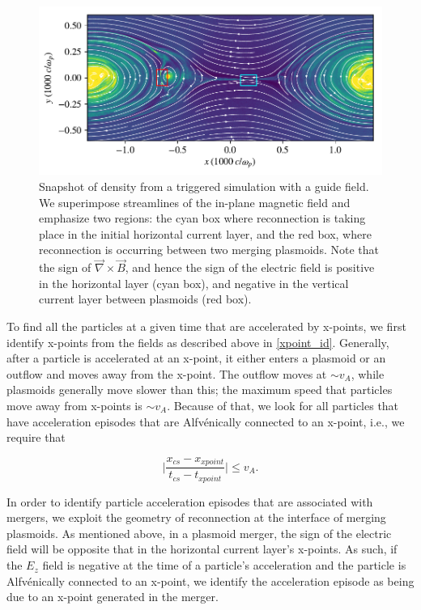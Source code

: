 \documentclass[iop,twocolappendix]{emulateapj}
\begin{document}
\begin{figure}[!h]
	\includegraphics[width=\linewidth]{testing_blines.pdf}
	\caption{Snapshot of density from a triggered simulation with a guide field.  We superimpose streamlines of the in-plane magnetic field and emphasize two regions: the cyan box where reconnection is taking place in the initial horizontal current layer, and the red box, where reconnection is occurring between two merging plasmoids.  Note that the sign of $\vec{\nabla}\times \vec{B}$, and hence the sign of the electric field is positive in the horizontal layer (cyan box), and negative in the vertical current layer between plasmoids (red box).
	}
	\label{blines}
\end{figure}



To find all the particles at a given time that are accelerated by x-points, we first identify x-points from the fields as described above in \ref{xpoint_id}.  Generally, after a particle is accelerated at an x-point, it either enters a plasmoid or an outflow and moves away from the x-point.  The outflow moves at $\sim v_{A}$, while plasmoids generally move slower than this; the maximum speed that particles move away from x-points is $\sim v_{A}$.  Because of that, we look for all particles that have acceleration episodes that are Alfv\'enically connected to an x-point, i.e., we require that 

\begin{equation}
\lvert\frac{x_{cs} - x_{xpoint}}{t_{cs}-t_{xpoint}}\rvert \le v_{A}.
\end{equation}

In order to identify particle acceleration episodes that are associated with mergers, we exploit the geometry of reconnection at the interface of merging plasmoids.  As mentioned above, in a plasmoid merger, the sign of the electric field will be opposite that in the horizontal current layer's x-points. As such, if the $E_{z}$ field is negative at the time of a particle's acceleration and the particle is Alfv\'enically connected to an x-point, we identify the acceleration episode as being due to an x-point generated in the merger.
\end{document}

